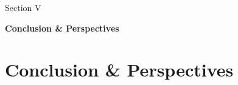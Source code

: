 \documentclass[8pt,aspectratio=169,xcolor=dvipsnames]{beamer}
\begin{document}
{
\begin{frame}[plain]

    \vfill
    \begin{center}
    {\color{white}\large Section V}

    \vspace{1cm}

    {\color{white}\bfseries\fontsize{28}{34}\selectfont Conclusion \& Perspectives}
    \end{center}
    \vfill

\end{frame}
}

\section{Conclusion \& Perspectives}
\end{document}
